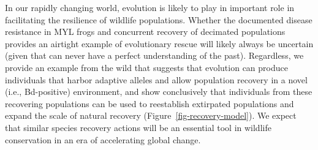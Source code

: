 \documentclass[9pt,twocolumn,twoside,lineno]{pnas-new}
\begin{document}
In our rapidly changing world, evolution is likely to play in important
role in facilitating the resilience of wildlife populations. Whether the
documented disease resistance in MYL frogs and concurrent recovery of
decimated populations provides an airtight example of evolutionary
rescue will likely always be uncertain (given that can never have a
perfect understanding of the past). Regardless, we provide an example
from the wild that suggests that evolution can produce individuals that
harbor adaptive alleles and allow population recovery in a novel (i.e.,
Bd-positive) environment, and show conclusively that individuals from
these recovering populations can be used to reestablish extirpated
populations and expand the scale of natural recovery
(Figure~\ref{fig-recovery-model}). We expect that similar species
recovery actions will be an essential tool in wildlife conservation in
an era of accelerating global change.
\end{document}
